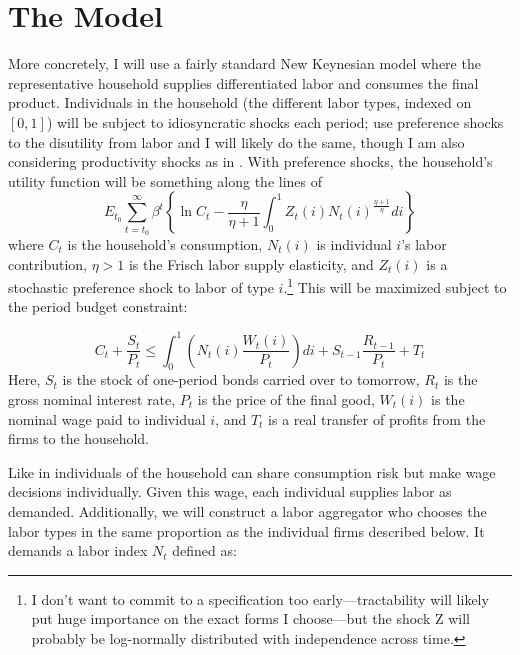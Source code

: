 \documentclass[12pt,a4paper]{scrartcl}            %
\begin{document}
\section{The Model}
\label{sec:the_model}

More concretely, I will use a fairly standard New Keynesian model where the representative household supplies differentiated labor and consumes the final product.
Individuals in the household (the different labor types, indexed on $[0, 1]$) will be subject to idiosyncratic shocks each period; \cite{daly_hobijn_2013} use preference shocks to the disutility from labor and I will likely do the same, though I am also considering productivity shocks as in \cite{fagan_messina_2009}. 
With preference shocks, the household's utility function will be something along the lines of
\begin{equation*}
    E_{t_0} \sum_{t=t_0}^{\infty} \beta^t \left\{\ln{C_t} - \frac{\eta}{\eta + 1} \int_{0}^{1} Z_t(i) N_t(i)^{\frac{\eta + 1}{\eta}} di \right\}
\end{equation*}
where $C_t$ is the household's consumption, $N_t(i)$ is individual $i$'s labor contribution, $\eta > 1$ is the Frisch labor supply elasticity, and $Z_t(i)$ is a stochastic preference shock to labor of type $i$.\footnote{I don't want to commit to a specification too early---tractability will likely put huge importance on the exact forms I choose---but the shock Z will probably be log-normally distributed with independence across time.}
This will be maximized subject to the period budget constraint:

\begin{equation*}
    C_t + \frac{S_t}{P_t} \leq \int_{0}^{1} \left( N_t(i) \frac{W_t(i)}{P_t}\right) di + S_{t-1}\frac{R_{t-1}}{P_t} + T_t
\end{equation*}
Here, $S_t$ is the stock of one-period bonds carried over to tomorrow, $R_t$ is the gross nominal interest rate, $P_t$ is the price of the final good, $W_t(i)$ is the nominal wage paid to individual $i$, and $T_t$ is a real transfer of profits from the firms to the household.

Like in \cite{erceg_henderson_levin_1999} individuals of the household can share consumption risk but make wage decisions individually.
Given this wage, each individual supplies labor as demanded.  Additionally, we will construct a labor aggregator who chooses the labor types in the same proportion as the individual firms described below.  It demands a labor index $N_t$ defined as:
\end{document}
